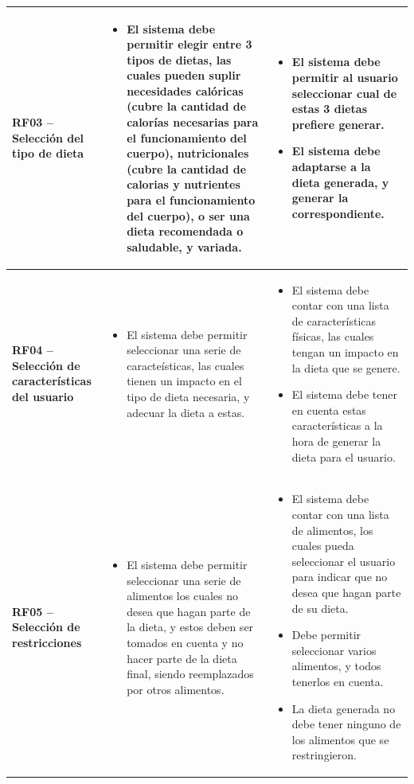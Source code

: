 \begin{longtable}[c]{| p{}  | p{}  | p{}  |}
         \textbf{RF03 -- Selecci\'on del tipo de dieta} & \begin{itemize}
             \item El sistema debe permitir elegir entre 3 tipos de dietas, las cuales pueden suplir necesidades cal\'oricas (cubre la cantidad de calor\'ias necesarias para el funcionamiento del cuerpo), nutricionales (cubre la cantidad de calorias y nutrientes para el funcionamiento del cuerpo), o ser una dieta recomendada o saludable, y variada.
         \end{itemize}& \begin{itemize}
             \item El sistema debe permitir al usuario seleccionar cual de estas 3 dietas prefiere generar.
             \item El sistema debe adaptarse a la dieta generada, y generar la correspondiente.
         \end{itemize} \\  \hline

         \textbf{RF04 -- Selecci\'on de caracter\'isticas del usuario} & \begin{itemize}
             \item El sistema debe permitir seleccionar una serie de caracte\'isticas, las cuales tienen un impacto en el tipo de dieta necesaria, y adecuar la dieta a estas.
         \end{itemize}& \begin{itemize}
             \item El sistema debe contar con una lista de caracter\'isticas f\'isicas, las cuales tengan un impacto en la dieta que se genere.
             \item El sistema debe tener en cuenta estas caracter\'isticas a la hora de generar la dieta para el usuario.
         \end{itemize} \\  \hline

          \textbf{RF05 -- Selecci\'on de restricciones} & \begin{itemize}
             \item El sistema debe permitir seleccionar una serie de alimentos los cuales no desea que hagan parte de la dieta, y estos deben ser tomados en cuenta y no hacer parte de la dieta final, siendo reemplazados por otros alimentos.
         \end{itemize}& \begin{itemize}
             \item El sistema debe contar con una lista de alimentos, los cuales pueda seleccionar el usuario para indicar que no desea que hagan parte de su dieta.
             \item Debe permitir seleccionar varios alimentos, y todos tenerlos en cuenta.
             \item La dieta generada no debe tener ninguno de los alimentos que se restringieron.
         \end{itemize} \\  \hline


\end{longtable}
